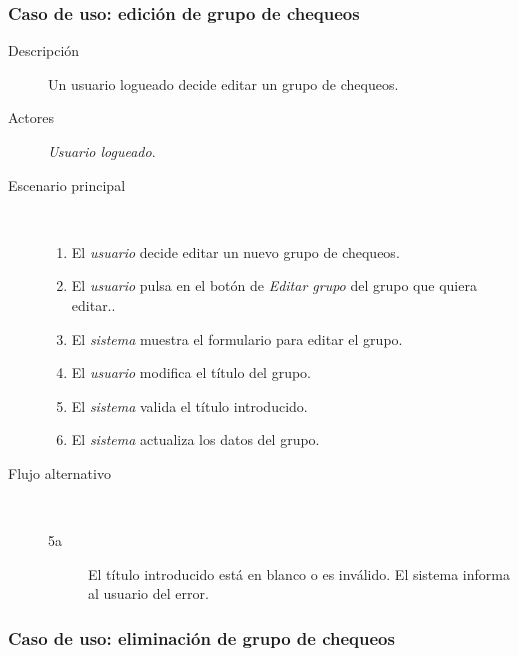 \subsubsection{Caso de uso: edición de grupo de chequeos}

\begin{description}
\item[Descripción] Un usuario logueado decide editar un grupo de chequeos.
\item[Actores] \textit{Usuario logueado}.
\item[Escenario principal] $\quad$
  \begin{enumerate}
  \item El \textit{usuario} decide editar un nuevo grupo de chequeos.
  \item El \textit{usuario} pulsa en el botón de \textit{Editar grupo} del grupo que quiera editar..
  \item El \textit{sistema} muestra el formulario para editar el grupo.
  \item El \textit{usuario} modifica el título del grupo.
  \item El \textit{sistema} valida el título introducido.
  \item El \textit{sistema} actualiza los datos del grupo.
  \end{enumerate}
\item[Flujo alternativo] $\quad$

  \begin{description}
  \item[5a] El título introducido está en blanco o es inválido. El sistema
    informa al usuario del error.
  \end{description}
\end{description}


\subsubsection{Caso de uso: eliminación de grupo de chequeos}

